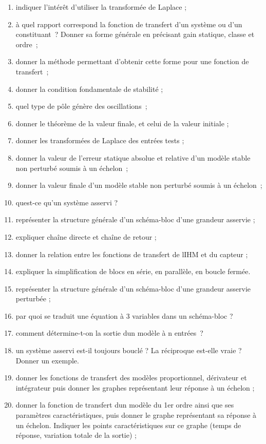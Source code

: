 \begin{enumerate}
\item indiquer l'intérêt d'utiliser la transformée de Laplace ;
\item à quel rapport correspond la fonction de transfert d'un système ou d'un constituant~? Donner sa forme générale en précisant gain statique, classe et ordre~;
\item donner la méthode permettant d'obtenir cette forme pour une fonction de transfert~;
\item donner la condition fondamentale de stabilité ;
\item quel type de pôle génère des oscillations~;
\item donner le théorème de la valeur finale, et celui de la valeur initiale ;
\item donner les transformées de Laplace des entrées tests ;
\item donner la valeur de l'erreur statique absolue et relative d'un modèle stable non perturbé soumis à un échelon~;
\item donner la valeur finale d'un modèle stable non perturbé soumis à un échelon~;
\item qu\textquotesingle est-ce qu'un système asservi ?
\item représenter la structure générale d'un schéma-bloc d'une grandeur asservie ;
\item expliquer chaîne directe et chaîne de retour ;
\item donner la relation entre les fonctions de transfert de l\textquotesingle IHM et du capteur ;
\item expliquer la simplification de blocs en série, en parallèle, en boucle fermée.
\item représenter la structure générale d'un schéma-bloc d'une grandeur asservie perturbée ;
\item par quoi se traduit une équation à 3 variables dans un schéma-bloc ?
\item comment détermine-t-on la sortie d\textquotesingle un modèle à n entrées~?
\item un système asservi est-il toujours bouclé ? La réciproque est-elle vraie ? Donner un exemple.
\item donner les fonctions de transfert des modèles proportionnel, dérivateur et intégrateur puis donner les graphes représentant leur réponse à un échelon ;
\item donner la fonction de transfert d\textquotesingle un modèle du 1er ordre ainsi que ses paramètres caractéristiques, puis donner le graphe représentant sa réponse à un échelon. Indiquer les points caractéristiques sur ce graphe (temps de réponse, variation totale de la sortie) ;

\end{enumerate}
